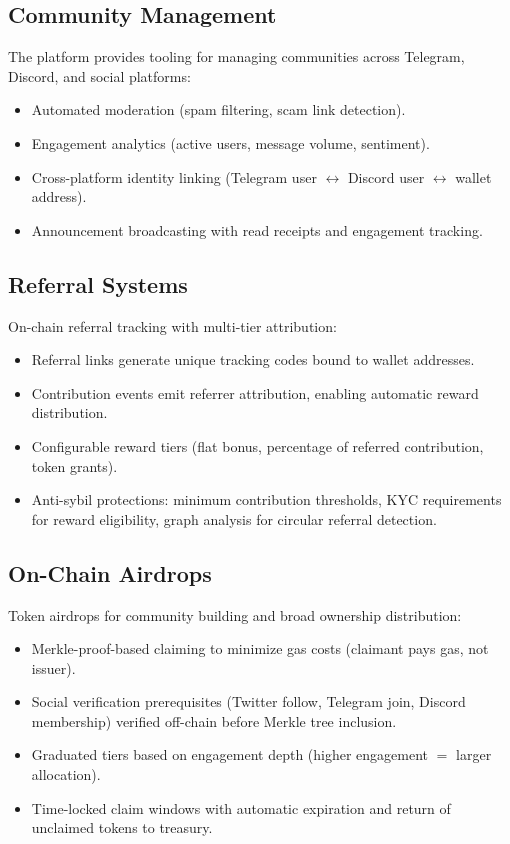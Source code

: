 \documentclass[11pt,letterpaper]{article}
\begin{document}
\subsection{Community Management}

The platform provides tooling for managing communities across Telegram, Discord,
and social platforms:

\begin{itemize}[leftmargin=1.2em]
    \item Automated moderation (spam filtering, scam link detection).
    \item Engagement analytics (active users, message volume, sentiment).
    \item Cross-platform identity linking (Telegram user $\leftrightarrow$
    Discord user $\leftrightarrow$ wallet address).
    \item Announcement broadcasting with read receipts and engagement tracking.
\end{itemize}

\subsection{Referral Systems}

On-chain referral tracking with multi-tier attribution:

\begin{itemize}[leftmargin=1.2em]
    \item Referral links generate unique tracking codes bound to wallet
    addresses.
    \item Contribution events emit referrer attribution, enabling automatic
    reward distribution.
    \item Configurable reward tiers (flat bonus, percentage of referred
    contribution, token grants).
    \item Anti-sybil protections: minimum contribution thresholds, KYC
    requirements for reward eligibility, graph analysis for circular referral
    detection.
\end{itemize}

\subsection{On-Chain Airdrops}

Token airdrops for community building and broad ownership distribution:

\begin{itemize}[leftmargin=1.2em]
    \item Merkle-proof-based claiming to minimize gas costs (claimant pays gas,
    not issuer).
    \item Social verification prerequisites (Twitter follow, Telegram join,
    Discord membership) verified off-chain before Merkle tree inclusion.
    \item Graduated tiers based on engagement depth (higher engagement $=$
    larger allocation).
    \item Time-locked claim windows with automatic expiration and return of
    unclaimed tokens to treasury.
\end{itemize}
\end{document}

